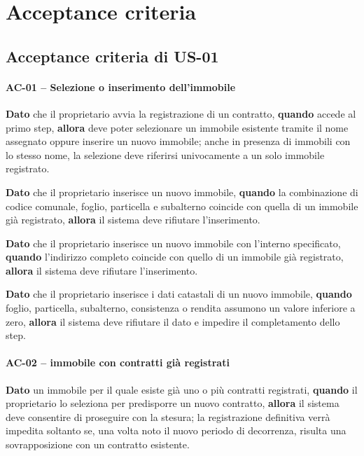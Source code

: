 \documentclass[12pt,a4paper]{article}
\begin{document}
\section{Acceptance criteria}

\subsection{Acceptance criteria di US-01}

\paragraph{AC-01 -- Selezione o inserimento dell'immobile}
\textbf{Dato} che il proprietario avvia la registrazione di un contratto,
\textbf{quando} accede al primo step,
\textbf{allora} deve poter selezionare un immobile esistente tramite il nome assegnato
oppure inserire un nuovo immobile; anche in presenza di immobili con lo stesso nome,
la selezione deve riferirsi univocamente a un solo immobile registrato.

\textbf{Dato} che il proprietario inserisce un nuovo immobile,
\textbf{quando} la combinazione di codice comunale, foglio, particella e subalterno
coincide con quella di un immobile già registrato,
\textbf{allora} il sistema deve rifiutare l'inserimento.

\textbf{Dato} che il proprietario inserisce un nuovo immobile con l'interno specificato,
\textbf{quando} l'indirizzo completo coincide con quello di un immobile già registrato,
\textbf{allora} il sistema deve rifiutare l'inserimento.

\textbf{Dato} che il proprietario inserisce i dati catastali di un nuovo immobile,
\textbf{quando} foglio, particella, subalterno, consistenza o rendita assumono un valore
inferiore a zero,
\textbf{allora} il sistema deve rifiutare il dato e impedire il completamento dello step.

\paragraph{AC-02 -- immobile con contratti già registrati}
\textbf{Dato} un immobile per il quale esiste già uno o più contratti registrati,
\textbf{quando} il proprietario lo seleziona per predisporre un nuovo contratto,
\textbf{allora} il sistema deve consentire di proseguire con la stesura; la registrazione
definitiva verrà impedita soltanto se, una volta noto il nuovo periodo di decorrenza,
risulta una sovrapposizione con un contratto esistente.
\end{document}
